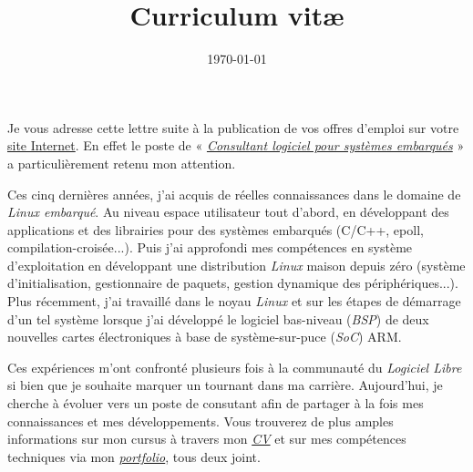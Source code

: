 \documentclass[11pt,a4paper,sans]{moderncv}
\title{Curriculum vit\ae}
\date{\today}
\begin{document}
\makelettertitle

Je vous adresse cette lettre suite à la publication de vos offres d'emploi sur votre \href{https://carrieres.savoirfairelinux.com/}{site Internet}. En effet le poste de « \href{https://carrieres.savoirfairelinux.com/#consultant-logiciel-pour-systemes-embarques}{\textit{Consultant logiciel pour systèmes embarqués}} » a particulièrement retenu mon attention.

Ces cinq dernières années, j'ai acquis de réelles connaissances dans le domaine de \textit{Linux embarqué}. Au niveau espace utilisateur tout d'abord, en développant des applications et des librairies pour des systèmes embarqués (C/C++, epoll, compilation-croisée...). Puis j'ai approfondi mes compétences en système d'exploitation en développant une distribution \textit{Linux} maison depuis zéro (système d'initialisation, gestionnaire de paquets, gestion dynamique des périphériques...). Plus récemment, j'ai travaillé dans le noyau \textit{Linux} et sur les étapes de démarrage d'un tel système lorsque j'ai développé le logiciel bas-niveau (\textit{BSP}) de deux nouvelles cartes électroniques à base de système-sur-puce (\textit{SoC}) ARM.

Ces expériences m'ont confronté plusieurs fois à la communauté du \textit{Logiciel Libre} si bien que je souhaite marquer un tournant dans ma carrière. Aujourd'hui, je cherche à évoluer vers un poste de consutant afin de partager à la fois mes connaissances et mes développements. Vous trouverez de plus amples informations sur mon cursus à travers mon \href{http://portay.fr/journees-quebec/pdf/french.pdf}{\textit{CV}} et sur mes compétences techniques via mon \href{http://portay.fr/journees-quebec/portfolio-french/index.html}{\textit{portfolio}}, tous deux joint.

\makeletterclosing
\end{document}

